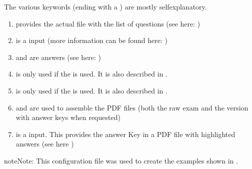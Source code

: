 \documentclass[letterpaper,10pt,english]{sphinxmanual}
\begin{document}
The various keywords (ending with a \sphinxcode{\sphinxupquote{:}}) are mostly self\sphinxhyphen{}explanatory.
\begin{enumerate}
%
\item {} 
 provides the actual file with the list of questions (see here: {\hyperref[\detokenize{Question format:my-reference-label}]{}})

\item {} 
 is a  input (more information can be found here: {\hyperref[\detokenize{spellcheck:spellcheck-label}]{}})

\item {} 
 and  are  answers (see here: {\hyperref[\detokenize{lms:lms-label}]{}})

\item {} 
 is only used if the   is used. It is also described in {\hyperref[\detokenize{lms:lms-label}]{}}.

\item {} 
 is only used if the   is used. It is also described in {\hyperref[\detokenize{lms:lms-label}]{}}.

\item {} 
 and  are used to assemble the PDF files (both the raw exam and the version with answer keys when requested)

\item {} 
 is a  input. This provides the answer Key in a PDF file with highlighted answers (see here {\hyperref[\detokenize{pdf:pdf-label}]{}})

\end{enumerate}

\begin{sphinxadmonition}{note}{Note:}
This configuration file was used to create the examples shown in {\hyperref[\detokenize{Full Example:example}]{}}.
\end{sphinxadmonition}
\end{document}
